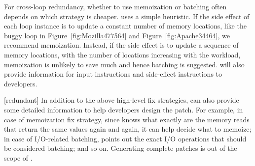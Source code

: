 For cross-loop redundancy, whether to use memoization or batching often
depends on which strategy is cheaper.
\Tool uses a simple
heuristic. If 
the side effect of each loop instance is to update 
a constant number of memory locations, like the 
buggy loop in Figure~\ref{fig:Mozilla477564} and Figure~\ref{fig:Apache34464}, 
we recommend memoization. Instead, if the side effect is to update
a sequence of memory locations, with the number of locations increasing
with the workload, memoization is unlikely to save much and
hence batching is suggested.
{\color{red} \Tool will also provide information for input instructions and side-effect instructions to developers. }

{\color{red} [redundant]
In addition to the above high-level fix strategies, \Tool can also provide some 
detailed information to help developers design the patch.
For example, in case of memoization fix strategy,
since \Tool knows what exactly are the memory reads that return the same values
again and again, it can help decide what to memoize; in case of
I/O-related batching, \Tool points out the exact I/O operations that should
be considered batching; and so on. 
Generating complete patches is out of the scope of \Tool.
}



